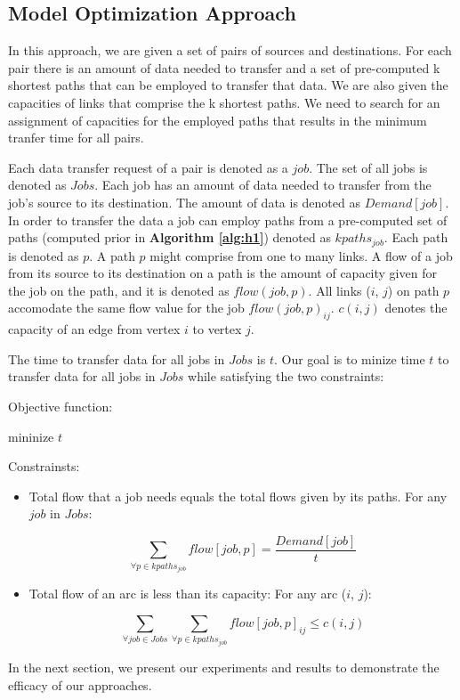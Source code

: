 \subsection{Model Optimization Approach}
\label{sec:optimization}

In this approach, we are given a set of pairs of sources and destinations. For each pair there is an amount of data needed to transfer and a set of pre-computed k shortest paths that can be employed to transfer that data. We are also given the capacities of links that comprise the k shortest paths. We need to search for an assignment of capacities for the employed paths that results in the minimum tranfer time for all pairs. 

Each data transfer request of a pair is denoted as a $job$. The set of all jobs is denoted as $Jobs$. Each job has an amount of data needed to transfer from the job's source to its destination. The amount of data is denoted as $Demand[job]$. In order to transfer the data a job can employ paths from a pre-computed set of paths (computed prior in \textbf{Algorithm \ref{alg:h1}}) denoted as $kpaths_{job}$. Each path is denoted as $p$. A path $p$ might comprise from one to many links. A flow of a job from its source to its destination on a path is the amount of capacity given for the job on the path, and it is denoted as $flow(job, p)$. All links ($i$, $j$) on path $p$ accomodate the same flow value for the job $flow(job, p)_{ij}$. $c(i,j)$ denotes the capacity of an edge from vertex $i$ to vertex $j$.

The time to transfer data for all jobs in $Jobs$ is $t$. Our goal is to minize time $t$ to transfer data for all jobs in $Jobs$ while satisfying the two constraints:

Objective function:

\begin{center}
mininize $t$
\end{center}

Constrainsts:
\begin{itemize}

\item Total flow that a job needs equals the total flows given by its paths. For any $job$ in $Jobs$: 

$$\sum_{\forall p \in kpaths_{job}} flow[job, p] = \frac{Demand[job]}{t}$$

\item Total flow of an arc is less than its capacity: For any arc ($i$, $j$):

$$\sum_{\forall job \in Jobs}\sum_{\forall p \in kpaths_{job}} flow[job, p]_{ij} \leq c(i, j) $$

\end{itemize}

%

In the next section, we present our experiments and results to demonstrate the efficacy of our approaches.
